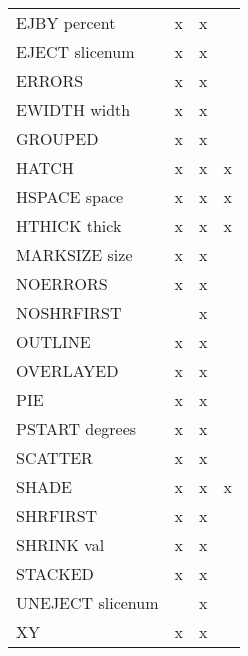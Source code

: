 \begin{center}
\begin{tabular}{lccc}
EJBY  percent                    &     x     &     x  &                    \\
EJECT  slicenum                  &     x     &     x  &                    \\
ERRORS                           &     x     &     x  &                    \\
EWIDTH  width                    &     x     &     x  &                    \\
GROUPED                          &     x     &     x  &                    \\
HATCH                            &     x     &     x  &       x            \\
HSPACE  space                    &     x     &     x  &       x            \\
HTHICK  thick                    &     x     &     x  &       x            \\
MARKSIZE  size                   &     x     &     x  &                    \\
NOERRORS                         &     x     &     x  &                    \\
NOSHRFIRST                       &           &     x  &                    \\
OUTLINE                          &     x     &     x  &                    \\
OVERLAYED                        &     x     &     x  &                    \\
PIE                              &     x     &     x  &                    \\
PSTART  degrees                  &     x     &     x  &                    \\
SCATTER                          &     x     &     x  &                    \\
SHADE                            &     x     &     x  &       x            \\
SHRFIRST                         &     x     &     x  &                    \\
SHRINK  val                      &     x     &     x  &                    \\
STACKED                          &     x     &     x  &                    \\
UNEJECT  slicenum                &           &     x  &                    \\
XY                               &     x     &     x  &                    \\ \hline

\end{tabular}
\end{center}
